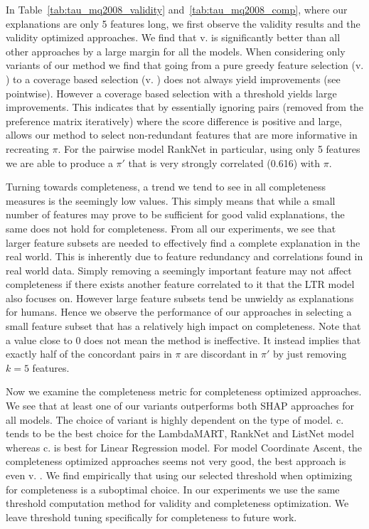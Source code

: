 In Table~\ref{tab:tau_mq2008_validity} and~\ref{tab:tau_mq2008_comp}, where our explanations are only 5 features long, we first observe the validity results and the validity optimized approaches. We find that v. \greedycovep is significantly better than all other approaches by a large margin for all the models. When considering only variants of our method we find that going from a pure greedy feature selection (v. \greedy) to a coverage based selection (v. \greedycov) does not always yield improvements (see pointwise). However a coverage based selection with a threshold yields large improvements. This indicates that by essentially ignoring pairs (removed from the preference matrix iteratively) where the score difference is positive and large, allows our method to select non-redundant features that are more informative in recreating $\pi$. For the pairwise model RankNet in particular, using only 5 features we are able to produce a $\pi'$ that is very strongly correlated (0.616) with $\pi$. 

Turning towards completeness, a trend we tend to see in all completeness measures is the seemingly low values. This simply means that while a small number of features may prove to be sufficient for good valid explanations, the same does not hold for completeness. From all our experiments, we see that larger feature subsets are needed to effectively find a complete explanation in the real world. This is inherently due to feature redundancy and correlations found in real world data. Simply removing a seemingly important feature may not affect completeness if there exists another feature correlated to it that the LTR model also focuses on. However large feature subsets tend be unwieldy as explanations for humans. Hence we observe the performance of our approaches in selecting a small feature subset that has a relatively high impact on completeness. Note that a value close to 0 does not mean the method is ineffective. It instead implies that exactly half of the concordant pairs in $\pi$ are discordant in $\pi'$ by just removing $k=5$ features.

Now we examine the completeness metric for completeness optimized approaches. We see that at least one of our variants outperforms both \textsc{SHAP} approaches for all models. The choice of variant is highly dependent on the type of model. c. \greedy tends to be the best choice for the LambdaMART, RankNet and ListNet model whereas c. \greedycov is best for Linear Regression model. For model Coordinate Ascent, the completeness optimized approaches seems not very good, the best approach is even v. \greedycovep. We find empirically that using our selected threshold when optimizing for completeness is a suboptimal choice. In our experiments we use the same threshold computation method for validity and completeness optimization. We leave threshold tuning specifically for completeness to future work.

